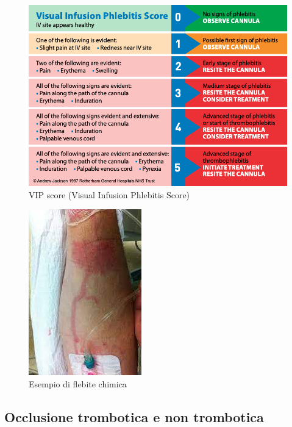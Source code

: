 \begin{figure}[H]
    \begin{center}
    \includegraphics[width=0.6\columnwidth]{img/VIPSCORE.png}
    \vspace{-3mm}
    \end{center}
    \caption{VIP score (Visual Infusion Phlebitis Score)
    \cite{img52}}
    \label{fig:FIGURE_4.16}
\end{figure}

\begin{figure}[H]
    \begin{center}
    \includegraphics[width=0.2\columnwidth]{img/flebite.jpeg}
    \vspace{-3mm}
    \end{center}
    \caption{Esempio di flebite chimica
    \cite{img53}}
    \label{fig:FIGURE_4.17}
\end{figure}

\subsection{Occlusione trombotica e non trombotica}

